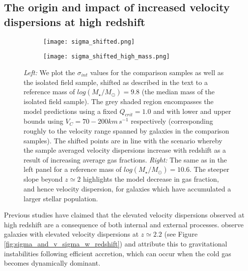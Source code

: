 \documentclass[fleqn,usenatbib]{mnras}
\begin{document}
\subsection{The origin and impact of increased velocity dispersions at high redshift}\label{discussion_increase_in_sigma}

\begin{figure*}
    \centering \hspace{-1.3cm}
    \begin{subfigure}[h!]{0.5\textwidth}
        \centering
        \texttt{[image: sigma\_shifted.png]}
    \end{subfigure} \hspace{+0.4cm}
    \begin{subfigure}[h!]{0.5\textwidth}
        \centering
        \texttt{[image: sigma\_shifted\_high\_mass.png]}
    \end{subfigure}
    \caption{{\it Left:} We plot the $\sigma_{int}$ values for the comparison samples as well as the isolated field sample, shifted as described in the text to a reference mass of $log(M_{\star}/M_{\odot}) = 9.8$ (the median mass of the isolated field sample).
    The grey shaded region encompasses the model predictions using a fixed $Q_{crit} = 1.0$ and with lower and upper bounds using $V_{C} = 70-200km\,s^{-1}$ respectively (corresponding roughly to the velocity range spanned by galaxies in the comparison samples).
    The shifted points are in line with the scenario whereby the sample averaged velocity dispersions increase with redshift as a result of increasing average gas fractions. 
    {\it Right:} The same as in the left panel for a reference mass of $log(M_{\star}/M_{\odot}) = 10.6$.
    The steeper slope beyond $z\simeq2$ highlights the model decrease in gas fraction, and hence velocity dispersion, for galaxies which have accumulated a larger stellar population.}
    \label{fig:sigma_shifted}
\end{figure*}

Previous studies have claimed that the elevated velocity dispersions observed at high redshift are a consequence of both internal and external processes.
\cite{Law2009} observe galaxies with elevated velocity dispersions at $z\simeq2.2$ (see Figure \ref{fig:sigma_and_v_sigma_w_redshift}) and attribute this to gravitational instabilities following efficient accretion, which can occur when the cold gas becomes dynamically dominant.
\end{document}
